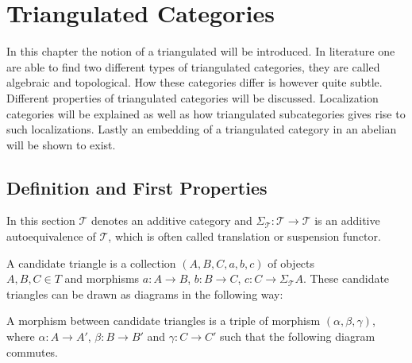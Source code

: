 \chapter{Triangulated Categories}

In this chapter the notion of a triangulated will be introduced. In literature one are able to find two different types of triangulated categories, they are called algebraic and topological. How these categories differ is however quite subtle. Different properties of triangulated categories will be discussed. Localization categories will be explained as well as how triangulated subcategories gives rise to such localizations. Lastly an embedding of a triangulated category in an abelian will be shown to exist.

\section{Definition and First Properties}

    In this section $\mathcal{T}$ denotes an additive category and $\Sigma_{\mathcal{T}}:\mathcal{T}\rightarrow\mathcal{T}$ is an additive autoequivalence of $\mathcal{T}$, which is often called translation or suspension functor.
    
    \begin{definition}
        A candidate triangle is a collection $(A,B,C,a,b,c)$ of objects \\ $A,B,C\in T$ and morphisms $a:A\rightarrow B$, $b:B\rightarrow C$, $c:C\rightarrow \Sigma_{\mathcal{T}}A$. These candidate triangles can be drawn as diagrams in the following way:

        \begin{center}
        \end{center}

        A morphism between candidate triangles is a triple of morphism $(\alpha, \beta, \gamma)$, where $\alpha : A \rightarrow A'$, $\beta : B \rightarrow B'$ and $\gamma : C \rightarrow C'$ such that the following diagram commutes.

    \begin{center}
    \end{center}

    \end{definition}

